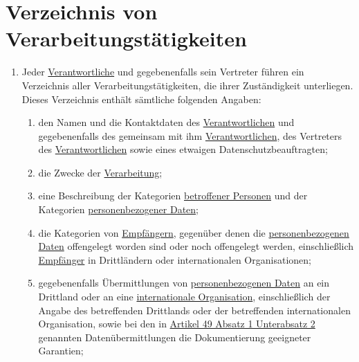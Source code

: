 \chapter{Verzeichnis von Verarbeitungstätigkeiten}
\label{ch:30}


\begin{enumerate}

  \item Jeder \hyperref[itm:04-7]{Verantwortliche} und gegebenenfalls sein Vertreter führen ein Verzeichnis aller Verarbeitungstätigkeiten,
   die ihrer Zuständigkeit unterliegen. Dieses Verzeichnis enthält sämtliche folgenden Angaben:
  \label{itm:30-1}

  \begin{enumerate}
  
    \item den Namen und die Kontaktdaten des \hyperref[itm:04-7]{Verantwortlichen} und gegebenenfalls des gemeinsam mit ihm \hyperref[itm:04-7]{Verantwortlichen},
     des Vertreters des \hyperref[itm:04-7]{Verantwortlichen} sowie eines etwaigen Datenschutzbeauftragten;
    \label{itm:30-1a}

    \item die Zwecke der \hyperref[itm:04-2]{Verarbeitung};
    \label{itm:30-1b}

    \item eine Beschreibung der Kategorien \hyperref[itm:04-1]{betroffener Personen} und der Kategorien \hyperref[itm:04-1]{personenbezogener Daten};
    \label{itm:30-1c}

    \item die Kategorien von \hyperref[itm:04-9]{Empfängern}, gegenüber denen die \hyperref[itm:04-1]{personenbezogenen Daten} offengelegt worden sind oder noch
     offengelegt werden, einschließlich \hyperref[itm:04-9]{Empfänger} in Drittländern oder internationalen Organisationen;
    \label{itm:30-1d}

    \item gegebenenfalls Übermittlungen von \hyperref[itm:04-1]{personenbezogenen Daten} an ein Drittland oder an eine \hyperref[itm:04-29]{internationale
     Organisation}, einschließlich der Angabe des betreffenden Drittlands oder der betreffenden internationalen
     Organisation, sowie bei den in \hyperref[itm:49-1-2]{Artikel 49 Absatz 1 Unterabsatz 2} genannten
     Datenübermittlungen die Dokumentierung geeigneter Garantien;
    \label{itm:30-1e}


\end{enumerate}
\end{enumerate}

